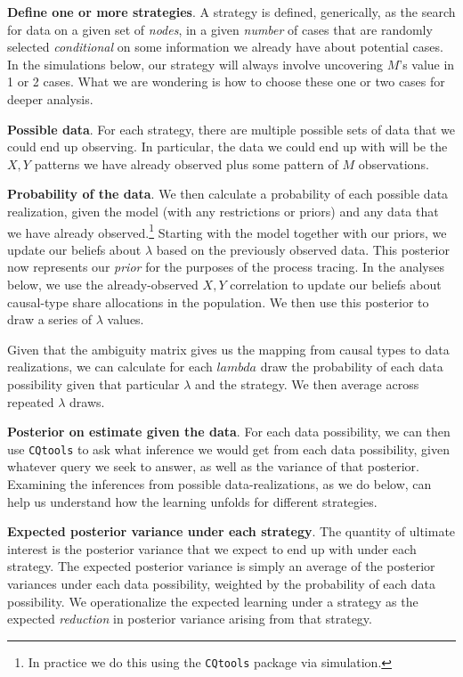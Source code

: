 \documentclass[
  12pt,
]{book}
\begin{document}
\textbf{Define one or more strategies}. A strategy is defined, generically, as the search for data on a given set of \emph{nodes}, in a given \emph{number} of cases that are randomly selected \emph{conditional} on some information we already have about potential cases. In the simulations below, our strategy will always involve uncovering \(M\)'s value in 1 or 2 cases. What we are wondering is how to choose these one or two cases for deeper analysis.

\textbf{Possible data}. For each strategy, there are multiple possible sets of data that we could end up observing. In particular, the data we could end up with will be the \(X,Y\) patterns we have already observed plus some pattern of \(M\) observations.

\textbf{Probability of the data}. We then calculate a probability of each possible data realization, given the model (with any restrictions or priors) and any data that we have already observed.\footnote{In practice we do this using the \texttt{CQtools} package via simulation.} Starting with the model together with our priors, we update our beliefs about \(\lambda\) based on the previously observed data. This posterior now represents our \emph{prior} for the purposes of the process tracing. In the analyses below, we use the already-observed \(X,Y\) correlation to update our beliefs about causal-type share allocations in the population. We then use this posterior to draw a series of \(\lambda\) values.

Given that the ambiguity matrix gives us the mapping from causal types to data realizations, we can calculate for each \(lambda\) draw the probability of each data possibility given that particular \(\lambda\) and the strategy. We then average across repeated \(\lambda\) draws.

\textbf{Posterior on estimate given the data}. For each data possibility, we can then use \texttt{CQtools} to ask what inference we would get from each data possibility, given whatever query we seek to answer, as well as the variance of that posterior. Examining the inferences from possible data-realizations, as we do below, can help us understand how the learning unfolds for different strategies.

\textbf{Expected posterior variance under each strategy}. The quantity of ultimate interest is the posterior variance that we expect to end up with under each strategy. The expected posterior variance is simply an average of the posterior variances under each data possibility, weighted by the probability of each data possibility. We operationalize the expected learning under a strategy as the expected \emph{reduction} in posterior variance arising from that strategy.
\end{document}
